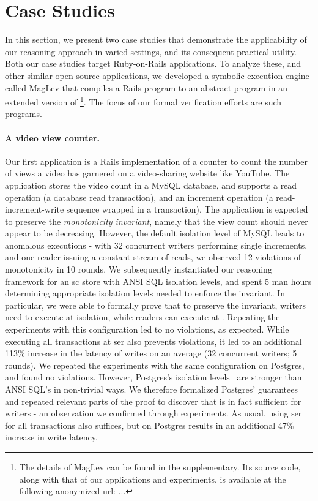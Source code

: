 \section{Case Studies}
\label{sec:case-studies}

In this section, we present two case studies that demonstrate the
applicability of our reasoning approach in varied settings, and its
consequent practical utility. Both our case studies target
Ruby-on-Rails applications. To analyze these, and other similar
open-source applications, we developed a symbolic execution engine
called {\sc MagLev} that compiles a Rails program to an abstract
program in an extended version of \txnimp\footnote{The details of {\sc
MagLev} can be found in the supplementary. Its source code, along with
that of our applications and experiments, is available at the
following anonymized url: \url{...}}. The focus of our formal
verification efforts are such \txnimp programs.

\paragraph{A video view counter.} Our first application is a Rails
implementation of a counter to count the number of views a video has
garnered on a video-sharing website like YouTube. The application
stores the video count in a MySQL database, and supports a read
operation (a database read transaction), and an increment operation (a
read-increment-write sequence wrapped in a transaction).  The
application is expected to preserve the \emph{monotonicity invariant},
namely that the view count should never appear to be decreasing.
However, the default  isolation level of MySQL
leads to anomalous executions - with 32 concurrent writers performing
single increments, and one reader issuing a constant stream of reads,
we observed 12 violations of monotonicity in 10 rounds. We
subsequently instantiated our reasoning framework for an {\sc sc}
store with ANSI SQL isolation levels, and spent 5 man hours
determining appropriate isolation levels needed to enforce the
invariant. In particular, we were able to formally prove that to
preserve the invariant, writers need to execute at 
isolation, while readers can execute at .
Repeating the experiments with this configuration led to no
violations, as expected. While executing all transactions at {\sc ser}
also prevents violations, it led to an additional 113\% increase in
the latency of writes on an average (32 concurrent writers; 5 rounds).
We repeated the experiments with the same configuration on Postgres,
and found no violations. However, Postgres's isolation
levels~\cite{postgresiso} are stronger than ANSI SQL's in non-trivial
ways. We therefore formalized Postgres' guarantees and repeated
relevant parts of the proof to discover that  is
in fact sufficient for writers - an observation we confirmed through
experiments. As usual, using {\sc ser} for all transactions also
suffices, but on Postgres results in an additional 47\% increase in
write latency.


